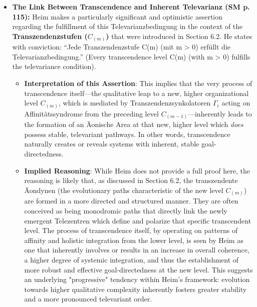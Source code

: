\documentclass[12pt]{article}
\newcommand{\q}[1]{\enquote{#1}}
\begin{document}
\begin{itemize}
    \item \textbf{The Link Between Transcendence and Inherent Televarianz (SM p. 115):}
    Heim makes a particularly significant and optimistic assertion regarding the fulfillment of this Televarianzbedingung in the context of the \textbf{Transzendenzstufen (\( C_{(m)} \))} that were introduced in Section 6.2. He states with conviction: \q{Jede Transzendenzstufe C(m) (mit m > 0) erfüllt die Televarianzbedingung.} (Every transcendence level C(m) (with m > 0) fulfills the televariance condition).
    \begin{itemize}
        \item \textbf{Interpretation of this Assertion}: This implies that the very process of transcendence itself—the qualitative leap to a new, higher organizational level \( C_{(m)} \), which is mediated by Transzendenzsynkolatoren \( \Gamma_i \) acting on Affinitätssyndrome from the preceding level \( C_{(m-1)} \)—inherently leads to the formation of an Äonische Area at that new, higher level which \textit{does} possess stable, televariant pathways. In other words, transcendence naturally creates or reveals systems with inherent, stable goal-directedness.
        \item \textbf{Implied Reasoning}: While Heim does not provide a full proof here, the reasoning is likely that, as discussed in Section 6.2, the transzendente Äondynen (the evolutionary paths characteristic of the new level \( C_{(m)} \)) are formed in a more directed and structured manner. They are often conceived as being monodromic paths that directly link the newly emergent Telezentren which define and polarize that specific transcendent level. The process of transcendence itself, by operating on patterns of affinity and holistic integration from the lower level, is seen by Heim as one that inherently involves or results in an increase in overall coherence, a higher degree of systemic integration, and thus the establishment of more robust and effective goal-directedness at the new level. This suggests an underlying "progressive" tendency within Heim's framework: evolution towards higher qualitative complexity inherently fosters greater stability and a more pronounced televariant order.
    \end{itemize}


\end{itemize}
\end{document}
